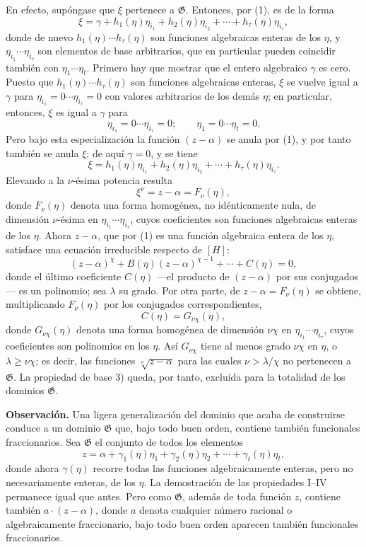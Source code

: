 En efecto, supóngase que $\xi$ pertenece a $\mathfrak G$. Entonces, por (1), es de la forma
\[
 \xi=\gamma+h_1(\eta)\eta_{i_1}+h_2(\eta)\eta_{i_2}
      +\cdots+h_\tau(\eta)\eta_{i_\tau},
\]
donde de nuevo $h_1(\eta)\cdots h_\tau(\eta)$ son funciones algebraicas enteras de los $\eta$, y $\eta_{i_1}\cdots\eta_{i_\tau}$ son elementos de base arbitrarios, que en particular pueden coincidir también con $\eta_1\cdots\eta_t$. Primero hay que mostrar que el entero algebraico $\gamma$ es cero. Puesto que $h_1(\eta)\cdots h_\tau(\eta)$ son funciones algebraicas enteras, $\xi$ se vuelve igual a $\gamma$ para
$\eta_{i_1}=0\cdots\eta_{i_\tau}=0$ con valores arbitrarios de los demás $\eta$; en particular, entonces, $\xi$ es igual a $\gamma$ para
\[
 \eta_{i_1}=0\cdots \eta_{i_\tau}=0; \qquad
 \eta_1=0\cdots \eta_t=0.
\]
Pero bajo esta especialización la función $(z-\alpha)$ se anula por (1), y por tanto también se anula $\xi$; de aquí $\gamma=0$, y se tiene
\[
 \xi=h_1(\eta)\eta_{i_1}+h_2(\eta)\eta_{i_2}
      +\cdots+h_\tau(\eta)\eta_{i_\tau}.
\]
Elevando a la $\nu$-ésima potencia resulta
\[
 \xi^\nu=z-\alpha=F_\nu(\eta),
\]
donde $F_\nu(\eta)$ denota una forma homogénea, no idénticamente nula, de dimensión $\nu$-ésima en $\eta_{i_1}\cdots\eta_{i_\tau}$, cuyos coeficientes son funciones algebraicas enteras de los $\eta$. Ahora $z-\alpha$, que por (1) es una función algebraica entera de los $\eta$, satisface una ecuación irreducible respecto de $[H]$:
\[
 (z-\alpha)^\chi+B(\eta)(z-\alpha)^{\chi-1}+\cdots+C(\eta)=0,
\]
donde el último coeficiente $C(\eta)$ ---el producto de $(z-\alpha)$ por sus conjugados--- es un polinomio; sea $\lambda$ su grado. Por otra parte, de $z-\alpha=F_\nu(\eta)$ se obtiene, multiplicando $F_\nu(\eta)$ por los conjugados correspondientes,
\[
 C(\eta)=G_{\nu\chi}(\eta),
\]
donde $G_{\nu\chi}(\eta)$ denota una forma homogénea de dimensión $\nu\chi$ en $\eta_{i_1}\cdots\eta_{i_\tau}$, cuyos coeficientes son polinomios en los $\eta$. Así $G_{\nu\chi}$ tiene al menos grado $\nu\chi$ en $\eta$, o $\lambda\geq\nu\chi$; es decir, las funciones $\sqrt[\nu]{z-\alpha}$ para las cuales $\nu>\lambda/\chi$ no pertenecen a $\mathfrak G$. La propiedad de base 3) queda, por tanto, excluida para la totalidad de los dominios $\mathfrak G$.

\textbf{Observación.} Una ligera generalización del dominio que acaba de construirse conduce a un dominio $\mathfrak G$ que, bajo todo buen orden, contiene también funcionales fraccionarios. Sea $\mathfrak G$ el conjunto de todos los elementos
\[
 z=\alpha+\gamma_1(\eta)\eta_1+\gamma_2(\eta)\eta_2
      +\cdots+\gamma_t(\eta)\eta_t,
\]
donde ahora $\gamma(\eta)$ recorre todas las funciones algebraicamente enteras, pero no necesariamente enteras, de los $\eta$. La demostración de las propiedades I--IV permanece igual que antes. Pero como $\mathfrak G$, además de toda función $z$, contiene también $a\cdot(z-\alpha)$, donde $a$ denota cualquier número racional o algebraicamente fraccionario, bajo todo buen orden aparecen también funcionales fraccionarios.

